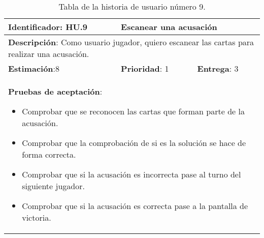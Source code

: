 \begin{table}[h]
  \begin{center}
    \begin{tabular}{|p{4cm}|p{4cm}|p{4cm}|}

    \hline
    \textbf{Identificador}: HU.9
    & \multicolumn{2}{p{8cm}|}{Escanear una acusación}\\

    \hline
    \multicolumn{3}{|p{12cm}|}{\textbf{Descripción}: Como usuario jugador, quiero escanear las cartas para realizar una acusación.}\\

    \hline
    \textbf{Estimación}:8
    & \textbf{Prioridad}: 1
    & \textbf{Entrega}: 3\\

    \hline
    \multicolumn{3}{|p{12cm}|}{\textbf{Pruebas de aceptación}:
      \begin{itemize}
        \item Comprobar que se reconocen las cartas que forman parte de la acusación.
        \item Comprobar que la comprobación de si es la solución se hace de forma correcta.
        \item Comprobar que si la acusación es incorrecta pase al turno del siguiente jugador.
        \item Comprobar que si la acusación es correcta pase a la pantalla de victoria.
      \end{itemize}
    }\\

    \hline

    \end{tabular}

    \caption{Tabla de la historia de usuario número 9.}
    \label{tabla-hu9}

  \end{center}
\end{table}

